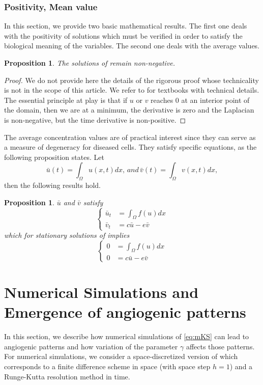 \documentclass[final,1p,times]{elsarticle}
\newtheorem{prop}[thm]{Proposition}
\begin{document}
\subsubsection{Positivity, Mean value}
In this section, we provide two basic mathematical results. The first one deals with the positivity of solutions which must be verified in order to satisfy the biological meaning of the variables. The second one deals with the average values.
\begin{prop}
    The solutions of  remain non-negative.
\end{prop}
\begin{proof}
    We do not provide here the details of the rigorous proof whose technicality is not in the scope of this article. We refer to \cite{BookProtter-Weinberger,BookSmoller} for textbooks with technical details.  The essential principle at play is that if $u$ or $v$ reaches $0$ at an interior point of the domain, then we are at a minimum,  the derivative is zero and the Laplacian is non-negative, but the time derivative is non-positive.
    
\end{proof}
The average concentration values are of practical interest since they can serve as a measure of degeneracy for diseased cells. They satisfy specific equations, as the following proposition states.
Let 
\[\bar{u}(t)=\int_{\Omega}u(x,t)dx,\, and \,\bar{v}(t)=\int_{\Omega}v(x,t)dx,  \]
then the following results hold. 
\begin{prop}
$\bar{u}$ and  $\bar{v}$ satisfy
    \begin{equation}
\left\{
    \begin{array}{rl}
         \bar{u}_t&=\int_\Omega f(u)dx  \\
         \bar{v}_t&=c\bar{u}-e\bar{v}
    \end{array}
    \right.
    \label{eq:barODE}
\end{equation}
which for stationary solutions of  implies
 \begin{equation}
\left\{
    \begin{array}{rl}
         0&=\int_\Omega f(u)dx  \\
         0&=c\bar{u}-e\bar{v}
    \end{array}
    \right.
    \label{eq:StaBarODE}
\end{equation}
\end{prop}
\section{Numerical Simulations and Emergence of angiogenic patterns}
\label{sec:NSAP} In this section, we describe how numerical simulations of \eqref{eq:mKS} can lead to angiogenic patterns and how variation of the parameter $\gamma$ affects those patterns. For numerical simulations, we consider a space-discretized version of  which corresponds to a finite difference scheme in space (with space step $h=1$) and a Runge-Kutta resolution method in time.
\end{document}
